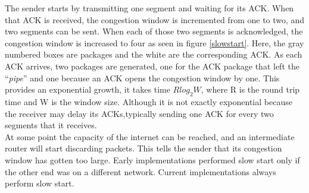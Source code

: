The sender starts by transmitting one segment and waiting for its ACK. When that ACK is received, the congestion window is incremented from one to two, and two segments can be sent.  When each of those two segments is acknowledged, the congestion window is increased to four as seen in figure \ref{slowstart}. Here, the gray numbered boxes are packages and the white are the corresponding ACK. As each ACK arrives, two packages are generated, one for the ACK package that left the ``\textit{pipe}'' and one because an ACK opens the congestion window by one. This provides an exponential growth, it takes time \textbf{$Rlog_2 W$}\cite{Jacobson:1988:CAC:52325.52356}, where R is the round trip time and W is the window size. Although it is not exactly exponential because the receiver may delay its ACKs,typically sending one ACK for every two segments that it receives.\\

At some point the capacity of the internet can be reached, and an intermediate router will start discarding packets.  This tells the sender that its congestion window has gotten too large. Early implementations performed slow start only if the other end was on a different network.  Current implementations always perform slow start.\\
